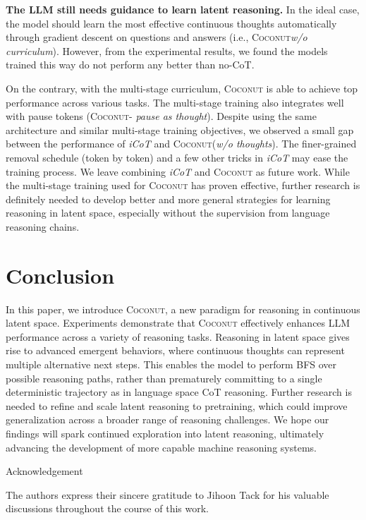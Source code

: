 \documentclass[]{fairmeta}
\newcommand{\ours}{\textsc{Coconut}\xspace}
\begin{document}
\noindent \textbf{The LLM still needs guidance to learn latent reasoning.} 
In the ideal case, the model should learn the most effective continuous thoughts automatically through gradient descent on questions and answers (i.e., \ours \textit{w/o curriculum}). However, from the experimental results, we found  the models trained this way do not perform any better than no-CoT.


On the contrary, with the multi-stage curriculum, \ours is able to achieve top performance across various tasks. The multi-stage training also integrates well with pause tokens (\ours - \textit{pause as thought}). Despite using the same architecture and similar multi-stage training objectives, we observed a small gap between the performance of \textit{iCoT} and \ours (\textit{w/o thoughts}). The finer-grained removal schedule (token by token) and a few other tricks in \textit{iCoT} may ease the training process. We leave combining \textit{iCoT} and \ours as future work. While the multi-stage training used for \ours has proven effective, further research is definitely needed to develop better and more general strategies for learning reasoning in latent space, especially without the supervision from language reasoning chains.

\section{Conclusion}

In this paper, we introduce \ours, a new paradigm for reasoning in continuous latent space. Experiments demonstrate that \ours effectively enhances LLM performance across a variety of reasoning tasks. Reasoning in latent space gives rise to advanced emergent behaviors, where continuous thoughts can represent multiple alternative next steps. This enables the model to perform BFS over possible reasoning paths, rather than prematurely committing to a single deterministic trajectory as in language space CoT reasoning. Further research is needed to refine and scale latent reasoning to pretraining, which could improve generalization across a broader range of reasoning challenges. We hope our findings will spark continued exploration into latent reasoning, ultimately advancing the development of more capable machine reasoning systems.



\newpage
{\Large \sffamily Acknowledgement\par}
The authors express their sincere gratitude to Jihoon Tack for his valuable discussions throughout the course of this work.
\end{document}
